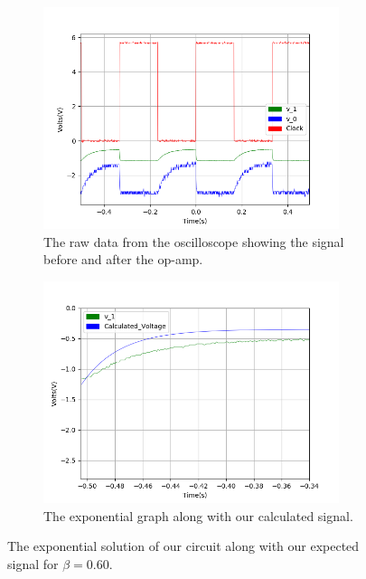 \begin{figure}[h!]
\centering
\begin{subfigure}[t]{.475\textwidth}
  \centering
  \includegraphics[width=0.95\textwidth, height=0.22\textheight]{figures/Exponential/scope_29raw.png}
  \caption{The raw data from the oscilloscope showing the signal before and after the op-amp.}
 \label{fig:Exp_6_raw}
\end{subfigure}\hfill
\begin{subfigure}[t]{.475\textwidth}
  \centering
  \includegraphics[width=0.95\textwidth, height=0.22\textheight]{figures/Exponential/scope_29_calc.png}
  \caption{The exponential graph along with our calculated signal.}
\label{fig:Exp_6_calc}
\end{subfigure}
\caption{The exponential solution of our circuit along with our expected signal for $\beta = 0.60$.}
\label{fig:Exp_6}
\end{figure}


